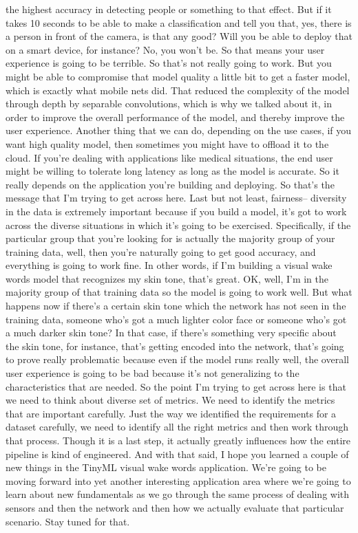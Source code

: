 the highest accuracy in detecting people or something to that effect.
But if it takes 10 seconds to be able to make a classification
and tell you that, yes, there is a person in front of the camera,
is that any good?
Will you be able to deploy that on a smart device, for instance?
No, you won't be.
So that means your user experience is going to be terrible.
So that's not really going to work.
But you might be able to compromise that model quality a little bit
to get a faster model, which is exactly what mobile nets did.
That reduced the complexity of the model through depth
by separable convolutions, which is why we talked about it, in order
to improve the overall performance of the model,
and thereby improve the user experience.
Another thing that we can do, depending on the use cases,
if you want high quality model, then sometimes you
might have to offload it to the cloud.
If you're dealing with applications like medical situations,
the end user might be willing to tolerate long latency
as long as the model is accurate.
So it really depends on the application you're building and deploying.
So that's the message that I'm trying to get across here.
Last but not least, fairness--
diversity in the data is extremely important because if you build a model,
it's got to work across the diverse situations in which it's
going to be exercised.
Specifically, if the particular group that you're looking for
is actually the majority group of your training data, well,
then you're naturally going to get good accuracy,
and everything is going to work fine.
In other words, if I'm building a visual wake words model that
recognizes my skin tone, that's great.
OK, well, I'm in the majority group of that training data
so the model is going to work well.
But what happens now if there's a certain skin tone which the network has
not seen in the training data, someone who's
got a much lighter color face or someone who's got a much darker skin tone?
In that case, if there's something very specific about the skin tone,
for instance, that's getting encoded into the network,
that's going to prove really problematic because even if the model runs really
well, the overall user experience is going
to be bad because it's not generalizing to the characteristics that are needed.
So the point I'm trying to get across here
is that we need to think about diverse set of metrics.
We need to identify the metrics that are important carefully.
Just the way we identified the requirements for a dataset carefully,
we need to identify all the right metrics
and then work through that process.
Though it is a last step, it actually greatly influences
how the entire pipeline is kind of engineered.
And with that said, I hope you learned a couple of new things
in the TinyML visual wake words application.
We're going to be moving forward into yet another interesting application
area where we're going to learn about new fundamentals
as we go through the same process of dealing with sensors and then
the network and then how we actually evaluate that particular scenario.
Stay tuned for that.


